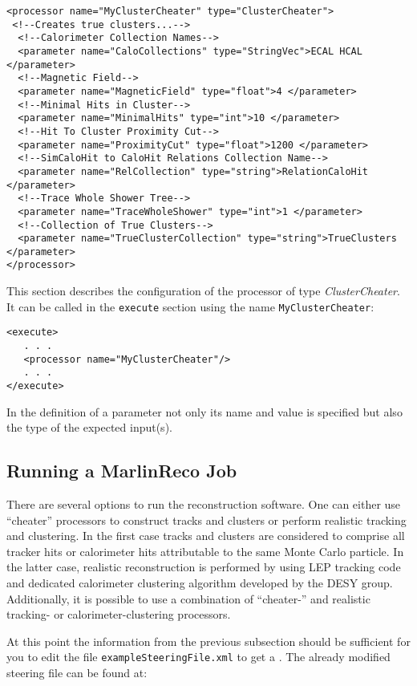 \begin{verbatim}
<processor name="MyClusterCheater" type="ClusterCheater">
 <!--Creates true clusters...-->
  <!--Calorimeter Collection Names-->
  <parameter name="CaloCollections" type="StringVec">ECAL HCAL  </parameter>
  <!--Magnetic Field-->
  <parameter name="MagneticField" type="float">4 </parameter>
  <!--Minimal Hits in Cluster-->
  <parameter name="MinimalHits" type="int">10 </parameter>
  <!--Hit To Cluster Proximity Cut-->
  <parameter name="ProximityCut" type="float">1200 </parameter>
  <!--SimCaloHit to CaloHit Relations Collection Name-->
  <parameter name="RelCollection" type="string">RelationCaloHit </parameter>
  <!--Trace Whole Shower Tree-->
  <parameter name="TraceWholeShower" type="int">1 </parameter>
  <!--Collection of True Clusters-->
  <parameter name="TrueClusterCollection" type="string">TrueClusters </parameter>
</processor>
\end{verbatim}

This section describes the configuration of the processor of type
{\em ClusterCheater}. It can be called in the {\tt execute} section
using the name {\tt MyClusterCheater}:

\begin{verbatim}
<execute>
   . . .
   <processor name="MyClusterCheater"/>
   . . .
</execute>
\end{verbatim}

In the definition of a parameter not only its name and value is
specified but also the type of the expected input(s).

\subsection{Running a MarlinReco Job}

There are several options to run the reconstruction software. One can
either use ``cheater'' processors to construct tracks and clusters or
perform realistic tracking and clustering. In the first case tracks
and clusters are considered to comprise all tracker hits or
calorimeter hits attributable to the same Monte Carlo particle. In the
latter case, realistic reconstruction is performed by using LEP
tracking code and dedicated calorimeter
clustering algorithm developed by the DESY group. Additionally, it is
possible to use a combination of ``cheater-'' and realistic tracking- or
calorimeter-clustering processors.

At this point the information from the previous subsection should be sufficient
for you to edit the file {\tt exampleSteeringFile.xml} to get a
.
The already modified steering file can be found at:

